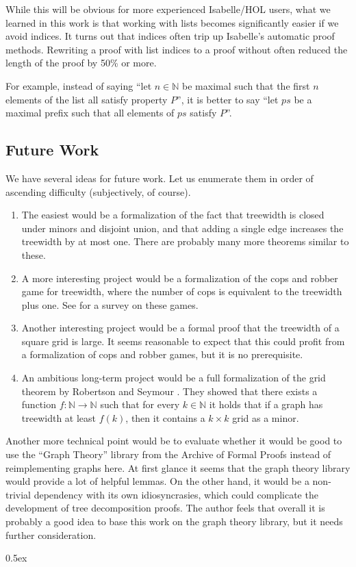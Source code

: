 \documentclass[11pt,a4paper]{scrartcl}
\begin{document}
While this will be obvious for more experienced Isabelle/HOL users,
what we learned in this work is that working with lists becomes
significantly easier if we avoid indices.  It turns out that indices
often trip up Isabelle's automatic proof methods.  Rewriting a proof
with list indices to a proof without often reduced the length of the
proof by 50\% or more.

For example, instead of saying ``let $n \in \mathbb{N}$ be maximal
such that the first $n$ elements of the list all satisfy property
$P$'', it is better to say ``let $ps$ be a maximal prefix such that
all elements of $ps$ satisfy $P$''.

\subsection{Future Work}

We have several ideas for future work.  Let us enumerate them in order
of ascending difficulty (subjectively, of course).
\begin{enumerate}
\item The easiest would be a formalization of the fact that treewidth
  is closed under minors and disjoint union, and that adding a single
  edge increases the treewidth by at most one.  There are probably
  many more theorems similar to these.
\item A more interesting project would be a formalization of the cops
  and robber game for treewidth, where the number of cops is
  equivalent to the treewidth plus one.  See \cite{fomin2008} for a
  survey on these games.
\item Another interesting project would be a formal proof that the
  treewidth of a square grid is large.  It seems reasonable to expect
  that this could profit from a formalization of cops and robber
  games, but it is no prerequisite.
\item An ambitious long-term project would be a full formalization of
  the grid theorem by Robertson and Seymour
  \cite{robertson_seymour_graphs/V}.  They showed that there exists a
  function $f: \mathbb{N} \to \mathbb{N}$ such that for every $k \in
  \mathbb{N}$ it holds that if a graph has treewidth at least $f(k)$,
  then it contains a $k \times k$ grid as a minor.
\end{enumerate}

Another more technical point would be to evaluate whether it would be
good to use the ``Graph Theory'' library \cite{Graph_Theory-AFP} from
the Archive of Formal Proofs instead of reimplementing graphs here.
At first glance it seems that the graph theory library would provide a
lot of helpful lemmas.  On the other hand, it would be a non-trivial
dependency with its own idiosyncrasies, which could complicate the
development of tree decomposition proofs.  The author feels that
overall it is probably a good idea to base this work on the graph
theory library, but it needs further consideration.

\parindent 0pt\parskip 0.5ex



\clearpage
{}
{}


\end{document}
